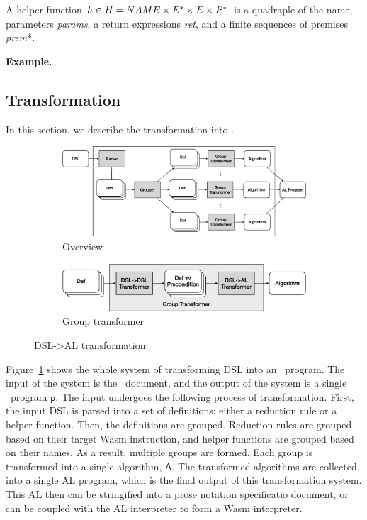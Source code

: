 A helper function $h \in H = NAME \times E^\ast \times E \times P^\ast$ is a quadraple of
the name, parameters \textit{params}, a return expressions \textit{ret}, and a finite sequences of premises \textit{prem}*.

\textbf{Example.} 

\subsection{Transformation}
In this section, we describe the transformation into \al.

\begin{figure}
  \centering
  \begin{subfigure}[b]{0.9\textwidth}
    \includegraphics[width=\textwidth]{img/trans1}
    \caption{Overview}
    \label{fig:overview}
  \end{subfigure}
  \hfill
  \begin{subfigure}[b]{0.9\textwidth}
    \includegraphics[width=\textwidth]{img/trans2}
    \caption{Group transformer}
    \label{fig:grouptrans}
  \end{subfigure}
  \caption{DSL->AL transformation}
  \label{fig:trans}
\end{figure}


Figure~\ref{fig:overview} shows the whole system of transforming DSL into an \al~program.
The input of the system is the \dsl~document,
and the output of the system is a single \al~program $\mathsf{p}$.
The input undergoes the following process of transformation.
First, the input DSL is parsed into a set of definitions: either a reduction rule or a
helper function. Then, the definitions are grouped. Reduction rules are grouped based on
their target Wasm instruction, and helper functions are grouped based on their names.
As a result, multiple groups are formed. Each group is transformed into a single algorithm,
$\mathsf{A}$. The transformed algorithms are collected into a single AL program, which is the
final output of this transformation system. This AL then can be stringified into a
prose notation specificatio document, or can be coupled with the AL interpreter to form a Wasm interpreter.

